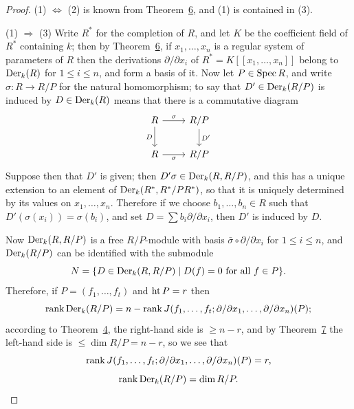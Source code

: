 \begin{proof}
(1) $\Leftrightarrow$ (2) is known from Theorem~\hyperref[thm:30.6]{6}, and (1) is contained in
(3).

(1) $\Rightarrow$ (3) Write $R^*$ for the completion of $R$, and let $K$ be the coefficient
field of $R^*$ containing $k$; then by Theorem~\hyperref[thm:30.6]{6}, if
$x_1, \ldots, x_n$ is a regular system of parameters of $R$ then the derivations
$\partial/\partial x_i$ of $R^* = K[[x_1, \ldots, x_n]]$ belong to $\operatorname{Der}_k(R)$ for $1 \le i \le n$, and
form a basis of it. Now let $P \in \operatorname{Spec} R$, and write $\sigma\colon R \to R/P$ for the
natural homomorphism; to say that $D' \in \operatorname{Der}_k(R/P)$ is induced by
$D \in \operatorname{Der}_k(R)$ means that there is a commutative diagram
\[
\begin{tikzcd}
R \arrow[r, "\sigma"] \arrow[d, "D"'] & R/P \arrow[d, "D'"] \\
R \arrow[r, "\sigma"'] & R/P
\end{tikzcd}
\]
Suppose then that $D'$ is given; then $D'\sigma \in \operatorname{Der}_k(R, R/P)$, and this has a
unique extension to an element of $\operatorname{Der}_k(R^*, R^*/PR^*)$, so that it is uniquely
determined by its values on $x_1, \ldots, x_n$. Therefore if we choose
$b_1, \ldots, b_n \in R$ such that $D'(\sigma(x_i)) = \sigma(b_i)$, and set
$D = \sum b_i \partial/\partial x_i$, then $D'$ is induced by $D$.

Now $\operatorname{Der}_k(R, R/P)$ is a free $R/P$-module with basis $\bar{\sigma} \circ \partial/\partial x_i$ for
$1 \le i \le n$, and $\operatorname{Der}_k(R/P)$ can be identified with the submodule
\[
  N = \{D \in \operatorname{Der}_k(R, R/P) \mid D(f) = 0 \text{ for all } f \in P\}.
\]
Therefore, if $P = (f_1, \ldots, f_t)$ and $\operatorname{ht} P = r$ then
\[
  \operatorname{rank} \operatorname{Der}_k(R/P) = n - \operatorname{rank} J(f_1, \ldots, f_t; \partial/\partial x_1, \ldots,
      \partial/\partial x_n)(P);
\]
according to Theorem~\hyperref[thm:30.4]{4}, the right-hand side is $\ge n - r$, and by
Theorem~\hyperref[thm:30.7]{7} the left-hand side is $\le \dim R/P = n - r$, so we see that
\[
  \operatorname{rank} J(f_1, \ldots, f_t; \partial/\partial x_1, \ldots, \partial/\partial x_n)(P) = r,
\]
\[
  \operatorname{rank} \operatorname{Der}_k(R/P) = \dim R/P.
\]
\end{proof}

